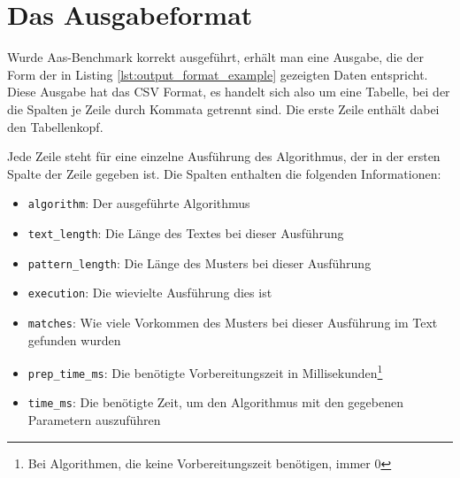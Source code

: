\documentclass[twocolumn]{article}
\begin{document}
\section{Das Ausgabeformat}

Wurde Aas-Benchmark korrekt ausgeführt, erhält man eine Ausgabe, die der Form der in Listing \ref{lst:output_format_example} gezeigten Daten entspricht. Diese Ausgabe hat das CSV Format, es handelt sich also um eine Tabelle, bei der die Spalten je Zeile durch Kommata getrennt sind. Die erste Zeile enthält dabei den Tabellenkopf.

Jede Zeile steht für eine einzelne Ausführung des Algorithmus, der in der ersten Spalte der Zeile gegeben ist. Die Spalten enthalten die folgenden Informationen:

\begin{itemize}
    \setlength\itemsep{0em}
    \item \texttt{algorithm}: Der ausgeführte Algorithmus
    \item \texttt{text\_length}: Die Länge des Textes bei dieser Ausführung
    \item \texttt{pattern\_length}: Die Länge des Musters bei dieser Ausführung
    \item \texttt{execution}: Die wievielte Ausführung dies ist
    \item \texttt{matches}: Wie viele Vorkommen des Musters bei dieser Ausführung im Text gefunden wurden
    \item \texttt{prep\_time\_ms}: Die benötigte Vorbereitungszeit in Millisekunden\footnote{Bei Algorithmen, die keine Vorbereitungszeit benötigen, immer 0}
    \item \texttt{time\_ms}: Die benötigte Zeit, um den Algorithmus mit den gegebenen Parametern auszuführen
\end{itemize}


\end{document}
